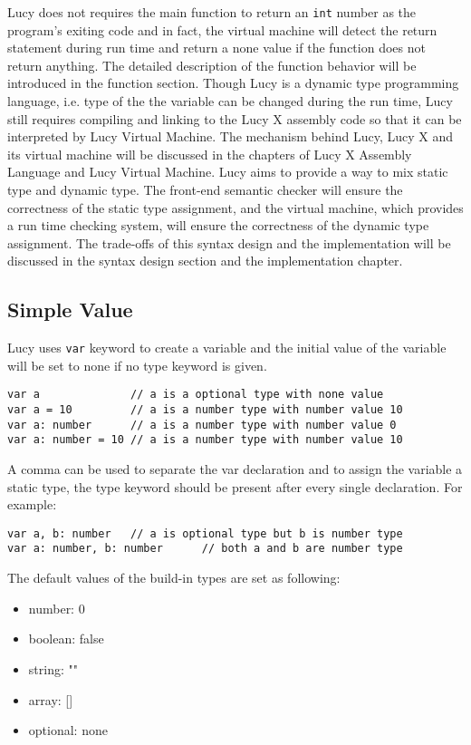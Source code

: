 Lucy does not requires the main function to return an \texttt{int} number as the program's exiting code and in fact, the virtual machine will detect the return statement during run time and return a none value if the function does not return anything. The detailed description of the function behavior will be introduced in the function section. Though Lucy is a dynamic type programming language, i.e. type of the the variable can be changed during the run time, Lucy still requires compiling and linking to the Lucy X assembly code so that it can be interpreted by Lucy Virtual Machine. The mechanism behind Lucy, Lucy X and its virtual machine will be discussed in the chapters of Lucy X Assembly Language and Lucy Virtual Machine. Lucy aims to provide a way to mix static type and dynamic type. The front-end semantic checker will ensure the correctness of the static type assignment, and the virtual machine, which provides a run time checking system, will ensure the correctness of the dynamic type assignment. The trade-offs of this syntax design and the implementation will be discussed in the syntax design section and the implementation chapter.

\subsection{Simple Value}
Lucy uses \texttt{var} keyword to create a variable and the initial value of the variable will be set to none if no type keyword is given.
\begin{lstlisting}
var a              // a is a optional type with none value
var a = 10         // a is a number type with number value 10
var a: number      // a is a number type with number value 0
var a: number = 10 // a is a number type with number value 10
\end{lstlisting}
A comma can be used to separate the var declaration and to assign the variable a static type, the type keyword should be present after every single declaration. For example:
\begin{lstlisting}
var a, b: number   // a is optional type but b is number type
var a: number, b: number      // both a and b are number type
\end{lstlisting}
The default values of the build-in types are set as following:
\begin{itemize}
  \item number: 0
  \item boolean: false
  \item string: ""
  \item array: []
  \item optional: none
\end{itemize}

